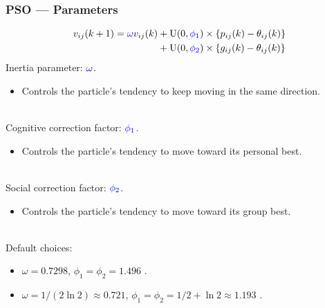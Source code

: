 \documentclass[xcolor=dvipsnames]{beamer}
\begin{document}
\begin{frame}
\frametitle{PSO --- Parameters}
\begin{align*}
v_{ij}(k+1) &= {\color{blue}\omega} v_{ij}(k) +  \mathrm{U}(0,{\color{blue}\phi_1})\times\{p_{ij}(k) - \theta_{ij}(k)\} \\
     &\;\phantom{= \omega v_{ij}(k)}+  \mathrm{U}(0,{\color{blue}\phi_2})\times\{g_{ij}(k) - \theta_{ij}(k)\}
\end{align*}
{\color{blue}Inertia} parameter: ${\color{blue}\omega}$.
\begin{itemize}
\item Controls the particle's tendency to keep moving in the same direction.\\~\\
\end{itemize}

{\color{blue}Cognitive} correction factor: ${\color{blue}\phi_1}$.
\begin{itemize}
\item Controls the particle's tendency to move toward its personal best.\\~\\
\end{itemize}

{\color{blue}Social} correction factor: ${\color{blue}\phi_2}$.
\begin{itemize}
\item Controls the particle's tendency to move toward its group best.\\~\\
\end{itemize}

Default choices:
\begin{itemize}
\item $\omega = 0.7298$, $\phi_1 = \phi_2 = 1.496$ \citep*{clerc2002particle}.
\item $\omega = 1/(2\ln 2)\approx 0.721$, $\phi_1=\phi_2=1/2 + \ln 2\approx 1.193$ \citep*{clerc2006stagnation}.
\end{itemize}

\end{frame}
\end{document}
